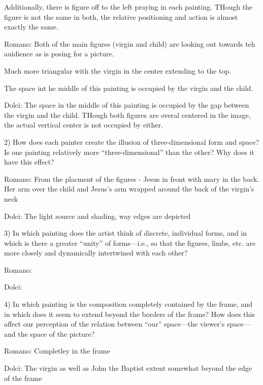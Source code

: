             Additionally, there is figure off to the left praying in each
            painting.  THough the figure is not the same in both, the relative
            positioning and action is almost exactly the same.


        Romano:
            Both of the main figures (virgin and child) are looking out towards
            teh auidience as is posing for a picture.

            Much more triangular with the virgin in the center extending to the
            top.

            The space int he middle of this painting is occupied by the virgin
            and the child.

        Dolci:
            The space in the middle of this painting is occupied by the gap
            between the virgin and the child.  THough both figures are overal
            centered in the image, the actual vertical center is not occupied
            by either.

    2)  How does each painter create the illusion of three-dimensional form and
        space?  Is one painting relatively more “three-dimensional” than the
        other? Why does it have this effect?

        Romano:
            From the placment of the figures - Jesus in front with mary in the
            back.  Her arm over the child and Jesus's arm wrapped around the
            back of the virgin's neck

        Dolci:
            The light source and shading, way edges are depicted


    3)  In which painting does the artist think of discrete, individual forms,
        and in which is there a greater “unity” of forms—i.e., so that the
        figures, limbs, etc. are more closely and dynamically intertwined with
        each other?

        Romano:

        Dolci:


    4)  In which painting is the composition completely contained by the frame,
        and in which does it seem to extend beyond the borders of the frame?
        How does this affect our perception of the relation between “our”
        space—the viewer’s space—and the space of the picture?

        Romano:
            Completley in the frame

        Dolci:
            The virgin as well as John the Baptist extent somewhat beyond the
            edge of the frame

